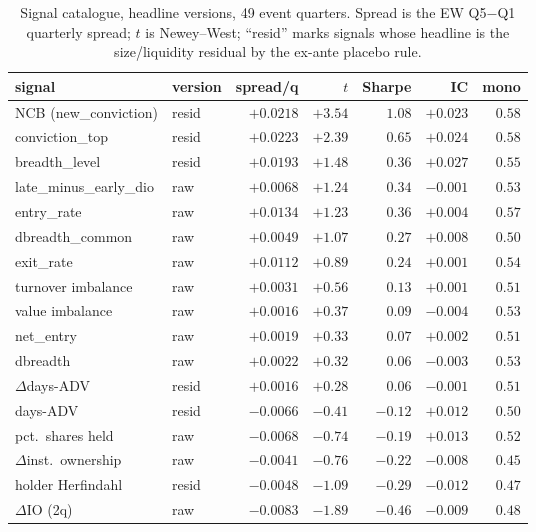 \begin{table}[t]
\centering\footnotesize
\caption{Signal catalogue, headline versions, 49 event quarters.
Spread is the EW Q5$-$Q1 quarterly spread; $t$ is Newey--West;
``resid'' marks signals whose headline is the size/liquidity residual
by the ex-ante placebo rule.}
\label{tab:catalogue}
\begin{tabular}{llrrrrr}
\toprule
signal & version & spread/q & $t$ & Sharpe & IC & mono \\
\midrule
NCB (new\_conviction) & resid & $+0.0218$ & $+3.54$ & $1.08$ & $+0.023$ & $0.58$ \\
conviction\_top & resid & $+0.0223$ & $+2.39$ & $0.65$ & $+0.024$ & $0.58$ \\
breadth\_level & resid & $+0.0193$ & $+1.48$ & $0.36$ & $+0.027$ & $0.55$ \\
late\_minus\_early\_dio & raw & $+0.0068$ & $+1.24$ & $0.34$ & $-0.001$ & $0.53$ \\
entry\_rate & raw & $+0.0134$ & $+1.23$ & $0.36$ & $+0.004$ & $0.57$ \\
dbreadth\_common & raw & $+0.0049$ & $+1.07$ & $0.27$ & $+0.008$ & $0.50$ \\
exit\_rate & raw & $+0.0112$ & $+0.89$ & $0.24$ & $+0.001$ & $0.54$ \\
turnover imbalance & raw & $+0.0031$ & $+0.56$ & $0.13$ & $+0.001$ & $0.51$ \\
value imbalance & raw & $+0.0016$ & $+0.37$ & $0.09$ & $-0.004$ & $0.53$ \\
net\_entry & raw & $+0.0019$ & $+0.33$ & $0.07$ & $+0.002$ & $0.51$ \\
dbreadth & raw & $+0.0022$ & $+0.32$ & $0.06$ & $-0.003$ & $0.53$ \\
$\Delta$days-ADV & resid & $+0.0016$ & $+0.28$ & $0.06$ & $-0.001$ & $0.51$ \\
days-ADV & resid & $-0.0066$ & $-0.41$ & $-0.12$ & $+0.012$ & $0.50$ \\
pct.\ shares held & raw & $-0.0068$ & $-0.74$ & $-0.19$ & $+0.013$ & $0.52$ \\
$\Delta$inst.\ ownership & raw & $-0.0041$ & $-0.76$ & $-0.22$ & $-0.008$ & $0.45$ \\
holder Herfindahl & resid & $-0.0048$ & $-1.09$ & $-0.29$ & $-0.012$ & $0.47$ \\
$\Delta$IO (2q) & raw & $-0.0083$ & $-1.89$ & $-0.46$ & $-0.009$ & $0.48$ \\
\bottomrule
\end{tabular}
\end{table}

